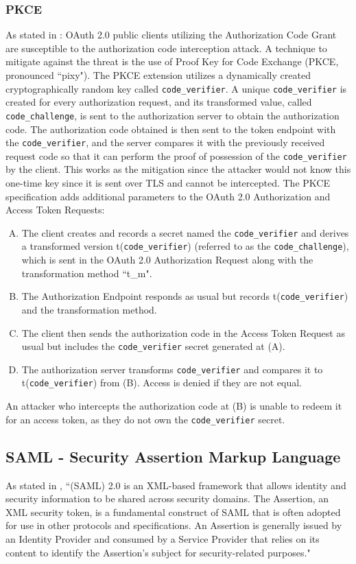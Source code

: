 \subsubsection{PKCE}
As stated in \cite{pkce_downgrade}: OAuth 2.0 public clients utilizing the Authorization Code Grant are susceptible to the authorization code interception attack. A technique to mitigate against the threat is the use of Proof Key for Code Exchange (PKCE, pronounced ``pixy"). The PKCE extension utilizes a dynamically created cryptographically random key called \texttt{code\_verifier}. A unique \texttt{code\_verifier} is created for every authorization request, and its transformed value, called \texttt{code\_challenge}, is sent to the authorization server to obtain the authorization code. The authorization code obtained is then sent to the token endpoint with the \texttt{code\_verifier}, and the server compares it with the previously received request code so that it can perform the proof of possession of the \texttt{code\_verifier} by the client. This works as the mitigation since the attacker would not know this one-time key since it is sent over TLS and cannot be intercepted.
The PKCE specification adds additional parameters to the OAuth 2.0 Authorization and Access Token Requests:
\begin{enumerate}[(A)]
    \item The client creates and records a secret named the \texttt{code\_verifier} and derives a transformed version t(\texttt{code\_verifier}) (referred to as the \texttt{code\_challenge}), which is sent in the OAuth 2.0 Authorization Request along with the transformation method ``t\_m".
    \item The Authorization Endpoint responds as usual but records t(\texttt{code\_verifier}) and the transformation method.
    \item The client then sends the authorization code in the Access Token Request as usual but includes the \texttt{code\_verifier} secret generated at (A).
    \item The authorization server transforms \texttt{code\_verifier} and compares it to t(\texttt{code\_verifier}) from (B).  Access is denied if they are not equal.
\end{enumerate}
An attacker who intercepts the authorization code at (B) is unable to redeem it for an access token, as they do not own the \texttt{code\_verifier} secret.

\subsection{SAML - Security Assertion Markup Language}
As stated in \cite{ietf_SAML}, ``(\Gls{SAML}) 2.0 is an XML-based framework that allows identity and security information to be shared across security domains. The Assertion, an XML security token, is a fundamental construct of \Gls{SAML} that is often adopted for use in other protocols and specifications. An Assertion is generally issued by an Identity Provider and consumed by a Service Provider that relies on its content to identify the Assertion's subject for security-related purposes."





